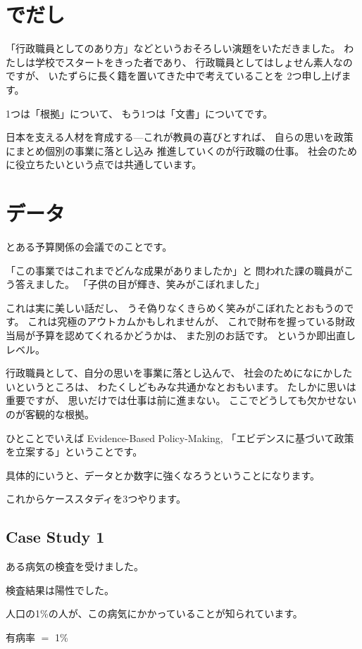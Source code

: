 \documentclass[uplatex,jis2004,dvipdfmx,12pt]{jsarticle}
\begin{document}
\section{でだし}
「行政職員としてのあり方」などというおそろしい演題をいただきました。
わたしは学校でスタートをきった者であり、
行政職員としてはしょせん素人なのですが、
いたずらに長く籍を置いてきた中で考えていることを
2つ申し上げます。

1つは「根拠」について、
もう1つは「文書」についてです。


日本を支える人材を育成する---これが教員の喜びとすれば、
自らの思いを政策にまとめ個別の事業に落とし込み
推進していくのが行政職の仕事。
社会のために役立ちたいという点では共通しています。


\section{データ}
とある予算関係の会議でのことです。

「この事業ではこれまでどんな成果がありましたか」と
問われた課の職員がこう答えました。
「子供の目が輝き、笑みがこぼれました」

これは実に美しい話だし、
うそ偽りなくきらめく笑みがこぼれたとおもうのです。
これは究極のアウトカムかもしれませんが、
これで財布を握っている財政当局が予算を認めてくれるかどうかは、
また別のお話です。
というか即出直しレベル。




行政職員として、自分の思いを事業に落とし込んで、
社会のためになにかしたいというところは、
わたくしどもみな共通かなとおもいます。
たしかに思いは重要ですが、
思いだけでは仕事は前に進まない。
ここでどうしても欠かせないのが客観的な根拠。

ひとことでいえば
Evidence-Based Policy-Making,
「エビデンスに基づいて政策を立案する」ということです。

具体的にいうと、データとか数字に強くなろうということになります。

これからケーススタディを3つやります。

\subsection{Case Study 1}

ある病気の検査を受けました。

検査結果は陽性でした。

人口の1\%の人が、この病気にかかっていることが知られています。

有病率 $=$ 1\%
\end{document}
